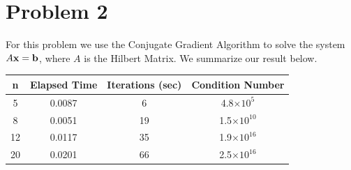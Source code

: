 \documentclass[a4paper,11pt]{article}
\begin{document}
\clearpage
\section*{Problem 2}
For this problem we use the Conjugate Gradient Algorithm to solve the system $A{\bf x}={\bf b}$, where $A$ is the Hilbert Matrix. We summarize our result below.

\begin{center}
	\begin{tabular}{||c | c | c | c|||} 
		\hline
		n & Elapsed Time & Iterations (sec) & Condition Number\\ [0.5ex] 
		\hline\hline
		5 & 0.0087 & 6 & 4.8$\times{10^{5}}$\\ 
		\hline
		8 & 0.0051 & 19 & 1.5$\times{10^{10}}$\\
		\hline
		12 & 0.0117 & 35 & 1.9$\times{10^{16}}$\\
		\hline
		20 & 0.0201 & 66 & 2.5$\times{10^{16}}$\\
		\hline
	\end{tabular}
\end{center}
\end{document}
